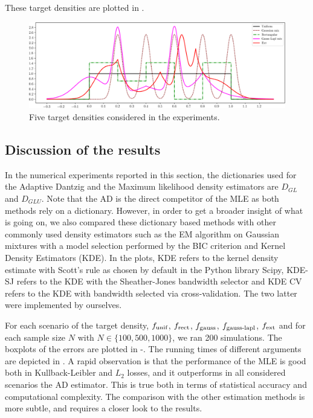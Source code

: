 These target densities are plotted in .
\begin{figure}[h]
\center
\includegraphics[width=\textwidth]{TeX_files/densities_f_star.png}
\caption{Five target densities considered in the experiments.}
\label{fig:target_densities}
\end{figure}

\subsection{Discussion of the results}

In the numerical experiments reported in this section, the dictionaries used for the Adaptive Dantzig 
and the Maximum likelihood density estimators are $D_{GL}$ and $D_{GLU}$. Note that the AD is the direct 
competitor of the MLE as both methods rely on a dictionary. However, in order to get a broader insight of
what is going on, we also compared these dictionary based methods with other commonly used density 
estimators such as the EM algorithm on Gaussian mixtures with a model selection performed by the BIC 
criterion and Kernel Density Estimators (KDE). In the plots, KDE refers to the kernel density estimate 
with Scott's rule as chosen by default in the Python library Scipy, KDE-SJ refers to the KDE with the 
Sheather-Jones bandwidth selector and KDE CV refers to the KDE with bandwidth selected via cross-validation. 
The two latter were implemented by ourselves. 

For each scenario of the target density, $f_{\textnormal{unif}}$, $f_{\textnormal{rect}}$, 
$f_{\textnormal{gauss}}$, $f_{\textnormal{gauss-lapl}}$, $f_{\textnormal{ext}}$ and for each sample size $N$  
with $N\in\{100, 500, 1000\}$, we ran 200 simulations. The boxplots of the errors are plotted in 
-. The running times of different arguments are 
depicted in . A rapid observation is that the performance of the MLE is good both 
in Kullback-Leibler and $L_2$ losses, and it outperforms in all considered scenarios the 
AD estimator. This is true both in terms of statistical accuracy and computational complexity. 
The comparison with the other estimation methods is more subtle, and requires a closer look
to the results.

